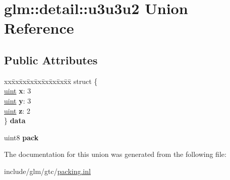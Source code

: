 \hypertarget{unionglm_1_1detail_1_1u3u3u2}{}\section{glm\+:\+:detail\+:\+:u3u3u2 Union Reference}
\label{unionglm_1_1detail_1_1u3u3u2}
\subsection*{Public Attributes}
\begin{DoxyCompactItemize}
\item 
\mbox{\label{unionglm_1_1detail_1_1u3u3u2_a57d54b9b29a5b2cae7b37e6428bd888b}} 
\begin{tabbing}
xx\=xx\=xx\=xx\=xx\=xx\=xx\=xx\=xx\=\kill
struct \{\\
\>\hyperlink{group__core__precision_ga4fd29415871152bfb5abd588334147c8}{uint} {\bfseries x}: 3\\
\>\hyperlink{group__core__precision_ga4fd29415871152bfb5abd588334147c8}{uint} {\bfseries y}: 3\\
\>\hyperlink{group__core__precision_ga4fd29415871152bfb5abd588334147c8}{uint} {\bfseries z}: 2\\
\} {\bfseries data}\\

\end{tabbing}\item 
\mbox{\label{unionglm_1_1detail_1_1u3u3u2_aea48c2c7d1d3283f3c785daa33551351}} 
uint8 {\bfseries pack}
\end{DoxyCompactItemize}


The documentation for this union was generated from the following file\+:\begin{DoxyCompactItemize}
\item 
include/glm/gtc/\hyperlink{packing_8inl}{packing.\+inl}\end{DoxyCompactItemize}
